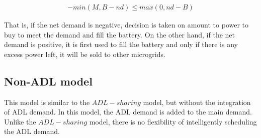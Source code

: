 \begin{align}
-min(M, B - nd) \leq max(0,nd - B) 
\end{align}

That is, if the net demand is negative, decision is taken on amount to power to buy to meet the demand and fill the battery. On the other hand, if the net demand is positive, it is first used to fill the battery and only if there is any excess power left, it will be sold to other microgrids. 

\subsection{Non-ADL model}

This model is similar to the $ADL-sharing$ model, but without the integration of ADL demand. In this model, the ADL demand is added to the main demand. Unlike the $ADL-sharing$ model, there is no flexibility of intelligently scheduling the ADL demand. 
